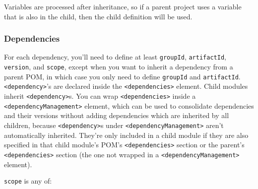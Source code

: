 \documentclass[8pt, table, xcdraw]{article}%
\begin{document}
Variables are processed after inheritance, so if a parent project uses a variable that is also in the child, then the child definition will be used.

\subsubsection{Dependencies}

For each dependency, you'll need to define at least \lstinline{groupId}, \lstinline{artifactId}, \lstinline{version}, and \lstinline{scope}, except when you want to inherit a dependency from a parent POM, in which case you only need to define \lstinline{groupId} and \lstinline{artifactId}. \lstinline{<dependency>}'s are declared inside the \lstinline{<dependencies>} element. Child modules inherit \lstinline{<dependency>}s. You can wrap \lstinline{<dependencies>} inside a \lstinline{<dependencyManagement>} element, which can be used to consolidate dependencies and their versions without adding dependencies which are inherited by all children, because \lstinline{<dependency>}s under \lstinline{<dependencyManagement>} aren't automatically inherited. They're only included in a child module if they are also specified in that child module's POM's \lstinline{<dependencies>} section or the parent's \lstinline{<dependencies>} section (the one not wrapped in a \lstinline{<dependencyManagement>} element).

\lstinline{scope} is any of:
\end{document}
